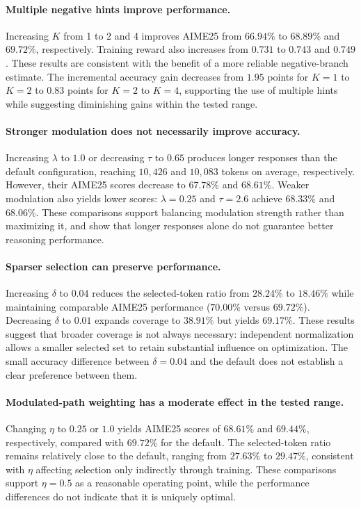 \paragraph{Multiple negative hints improve performance.}
Increasing $K$ from 1 to 2 and 4 improves AIME25 from $66.94\%$ to $68.89\%$ and $69.72\%$, respectively. Training reward also increases from $0.731$ to $0.743$ and $0.749$. These results are consistent with the benefit of a more reliable negative-branch estimate. The incremental accuracy gain decreases from $1.95$ points for $K=1$ to $K=2$ to $0.83$ points for $K=2$ to $K=4$, supporting the use of multiple hints while suggesting diminishing gains within the tested range.

\paragraph{Stronger modulation does not necessarily improve accuracy.}
Increasing $\lambda$ to $1.0$ or decreasing $\tau$ to $0.65$ produces longer responses than the default configuration, reaching $10{,}426$ and $10{,}083$ tokens on average, respectively. However, their AIME25 scores decrease to $67.78\%$ and $68.61\%$. Weaker modulation also yields lower scores: $\lambda=0.25$ and $\tau=2.6$ achieve $68.33\%$ and $68.06\%$. These comparisons support balancing modulation strength rather than maximizing it, and show that longer responses alone do not guarantee better reasoning performance.

\paragraph{Sparser selection can preserve performance.}
Increasing $\delta$ to $0.04$ reduces the selected-token ratio from $28.24\%$ to $18.46\%$ while maintaining comparable AIME25 performance ($70.00\%$ versus $69.72\%$). Decreasing $\delta$ to $0.01$ expands coverage to $38.91\%$ but yields $69.17\%$. These results suggest that broader coverage is not always necessary: independent normalization allows a smaller selected set to retain substantial influence on optimization. The small accuracy difference between $\delta=0.04$ and the default does not establish a clear preference between them.

\paragraph{Modulated-path weighting has a moderate effect in the tested range.}
Changing $\eta$ to $0.25$ or $1.0$ yields AIME25 scores of $68.61\%$ and $69.44\%$, respectively, compared with $69.72\%$ for the default. The selected-token ratio remains relatively close to the default, ranging from $27.63\%$ to $29.47\%$, consistent with $\eta$ affecting selection only indirectly through training. These comparisons support $\eta=0.5$ as a reasonable operating point, while the performance differences do not indicate that it is uniquely optimal.